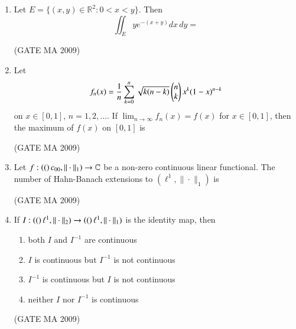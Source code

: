 \documentclass[journal,12pt,onecolumn]{IEEEtran}
\theoremstyle{remark}
\begin{document}
\begin{enumerate}[leftmargin=0pt, align=left, start=21]
\item Let $E=\{(x,y)\in\mathbb{R}^2: 0<x<y\}$. Then
$$
\iint_E y e^{-(x+y)} dx\, dy =
$$
\begin{enumerate}
\end{enumerate}
\hfill (GATE MA 2009)

\item Let
$$
f_n(x) = \frac{1}{n}\sum_{k=0}^n \sqrt{k(n-k)}\begin{pmatrix}n\\k\end{pmatrix} x^k (1-x)^{n-k}
$$
on $x\in[0,1]$, $n=1,2,...$. If $\lim_{n\to\infty} f_n(x) = f(x)$ for $x\in[0,1]$, then the maximum of $f(x)$ on $[0,1]$ is
\begin{enumerate}
\end{enumerate}
\hfill (GATE MA 2009)

\item Let $f:\left((\right)c_{00},\|\cdot\|_1)\to\mathbb{C}$ be a non-zero continuous linear functional. The number of Hahn-Banach extensions to $(\ell^1, \|\cdot\|_1)$ is
\begin{enumerate}
\end{enumerate}
\hfill (GATE MA 2009)

\item If $I:\left((\right)\ell^1,\|\cdot\|_2)\to\left((\right)\ell^1,\|\cdot\|_1)$ is the identity map, then
\begin{enumerate}
    \item both $I$ and $I^{-1}$ are continuous
    \item $I$ is continuous but $I^{-1}$ is not continuous
    \item $I^{-1}$ is continuous but $I$ is not continuous
    \item neither $I$ nor $I^{-1}$ is continuous
\end{enumerate}
\hfill (GATE MA 2009)


\end{enumerate}
\end{document}
